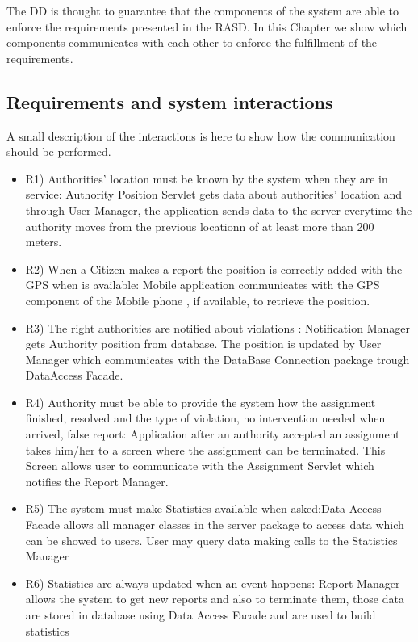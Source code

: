 The DD is thought to guarantee that the components of the system are able to enforce the requirements presented in the RASD.
\newline
In this Chapter we show which components communicates with each other to enforce the fulfillment of the requirements.
\subsection{Requirements and system interactions}
A small description of the interactions is here to show how the communication should be performed.  
\begin{itemize}
\item R1) Authorities’ location must be known by the system when they are in service: Authority Position Servlet gets data about authorities' location and through User Manager, the  application sends data to the server everytime the authority moves from the previous locationn of at least more than 200 meters.
\item R2) When a Citizen makes a report the position is correctly added with the GPS when is available: Mobile application communicates with the GPS component of the Mobile phone , if available, to retrieve the position.
\item R3) The right authorities are notified about violations : Notification Manager gets Authority position from database. The position is updated by User Manager which communicates with the DataBase Connection package trough DataAccess Facade.
\item R4) Authority must be able to provide the system how the assignment finished, resolved and the
type of violation, no intervention needed when arrived, false report: Application after an authority accepted an assignment takes him/her to a screen where the assignment can be terminated.
This Screen allows user to communicate with the Assignment Servlet which notifies the Report Manager.
\item R5) The system must make Statistics available when asked:Data Access Facade allows all manager classes in the server package to access data which can be showed to users. User may query data making calls to the Statistics Manager
\item  R6) Statistics are always updated when an event happens: Report Manager allows the system to get new reports and also to terminate them, those data are stored in database using Data Access Facade and are used to build statistics

\end{itemize}
